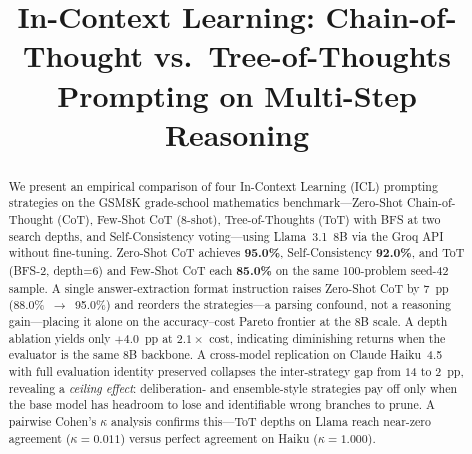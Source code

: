 \documentclass[conference]{IEEEtran}
\begin{document}
\title{In-Context Learning: Chain-of-Thought vs.\ Tree-of-Thoughts
Prompting on Multi-Step Reasoning}

\author{
\and
{}
}

\maketitle

\begin{abstract}
We present an empirical comparison of four In-Context Learning (ICL)
prompting strategies on the GSM8K grade-school mathematics
benchmark---Zero-Shot Chain-of-Thought (CoT), Few-Shot CoT (8-shot),
Tree-of-Thoughts (ToT) with BFS at two search depths, and
Self-Consistency voting---using Llama~3.1~8B via the Groq API without
fine-tuning.
Zero-Shot CoT achieves \textbf{95.0\%}, Self-Consistency
\textbf{92.0\%}, and ToT (BFS-2, depth=6) and Few-Shot CoT each
\textbf{85.0\%} on the same 100-problem seed-42 sample.
A single answer-extraction format instruction raises Zero-Shot CoT by
$7$~pp (88.0\%~$\rightarrow$~95.0\%) and reorders the strategies---a
parsing confound, not a reasoning gain---placing it alone on the
accuracy--cost Pareto frontier at the 8B scale.
A depth ablation yields only $+4.0$~pp at $2.1\times$ cost, indicating
diminishing returns when the evaluator is the same 8B backbone.
A cross-model replication on Claude Haiku~4.5 with full evaluation
identity preserved collapses the inter-strategy gap from $14$ to
$2$~pp, revealing a \emph{ceiling effect}: deliberation- and
ensemble-style strategies pay off only when the base model has headroom
to lose and identifiable wrong branches to prune.
A pairwise Cohen's $\kappa$ analysis confirms this---ToT depths on
Llama reach near-zero agreement ($\kappa{=}0.011$) versus perfect
agreement on Haiku ($\kappa{=}1.000$).
\end{abstract}
\end{document}
